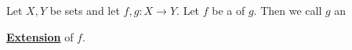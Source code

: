 \newcommand{\Extension}[0]{
    \textbf{\hyperref[def:FunctionExtension]{Extension}}
}
\newcommand{\Extensions}[0]{
    \textbf{\hyperref[def:FunctionExtension]{Extensions}}
}\begin{df}[Extension]
\label{def:FunctionExtension}

\rm
    Let $X,Y$ be sets and 
    let $f,g:X \to Y$.
    Let $f$ be a \Restriction
    of $g$. 
    Then we call $g$ an 
    \Extension of $f$. 
\end{df}

